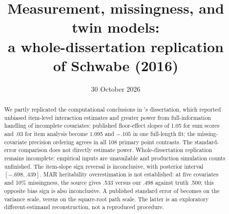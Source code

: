 

\newcommand{\artifact}[1]{\href{https://github.com/alectionary/vibe-math/blob/master/formalization/schwabe-psychometric-genetics/#1}{\nolinkurl{#1}}}
\title{Measurement, missingness, and twin models:\\a whole-dissertation replication\\of Schwabe (2016)}
\date{30 October 2026}

\maketitle
\begin{abstract}
We partly replicated the computational conclusions in \citet{schwabe2016}'s dissertation, which reported unbiased item-level interaction estimates and greater power from full-information handling of incomplete covariates: published floor-effect slopes of 1.05 for sum scores and .03 for item analysis become 1.095 and $-.105$ in one full-length fit; the missing-covariate precision ordering agrees in all 108 primary point contrasts. The standard-error comparison does not directly estimate power. Whole-dissertation replication remains incomplete: empirical inputs are unavailable and production simulation counts unfinished. The item-slope sign reversal is inconclusive, with posterior interval $[-.698,.439]$. MAR heritability overestimation is not established: at five covariates and 10\% missingness, the source gives .533 versus our .498 against truth .500; this opposite bias sign is also inconclusive. A published standard error of \SourceAse{} becomes \OursAse{} on the variance scale, versus \PathAse{} on the square-root path scale. The latter is an exploratory different-estimand reconstruction, not a reproduced procedure.
\end{abstract}

